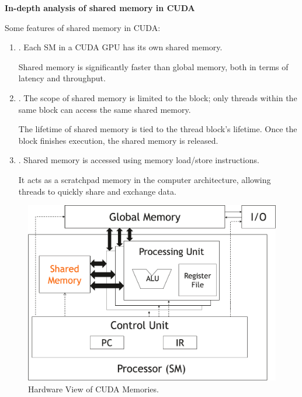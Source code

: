 \highspace
\begin{flushleft}
    \textcolor{Red2}{ \textbf{In-depth analysis of shared memory in CUDA}}
\end{flushleft}
Some features of shared memory in CUDA:
\begin{enumerate}
    \item {}. Each SM in a CUDA GPU has its own shared memory.
    
    Shared memory is significantly faster than global memory, both in terms of latency and throughput.
    
    
    \item {}. The scope of shared memory is limited to the block; only threads within the same block can access the same shared memory.
    
    The lifetime of shared memory is tied to the thread block's lifetime. Once the block finishes execution, the shared memory is released.
    
    
    \item {}. Shared memory is accessed using memory load/store instructions.
    
    It acts as a scratchpad memory in the computer architecture, allowing threads to quickly share and exchange data.
\end{enumerate}
\begin{figure}[!htp]
    \centering
    \includegraphics[width=.8\textwidth]{img/cuda-shared-memory-1.pdf}
    \caption{Hardware View of CUDA Memories.}
\end{figure}
